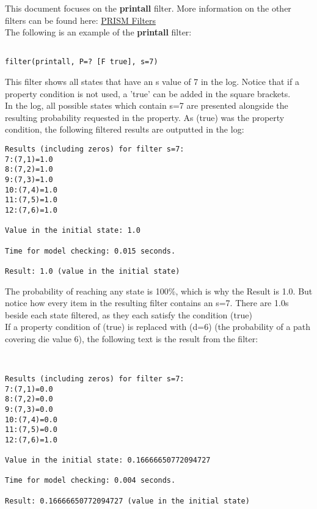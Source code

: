 \documentclass[a4paper]{article}
\begin{document}
This document focuses on the \textbf{printall} filter. 
\newline
More information on the other filters can be found here: \href{http://www.prismmodelchecker.org/manual/PropertySpecification/Filters}{PRISM Filters}
\\[1\baselineskip]
The following is an example of the \textbf{printall} filter:

\begin{lstlisting}

filter(printall, P=? [F true], s=7)
\end{lstlisting}

This filter shows all states that have an s value of 7 in the log. Notice that if a property condition is not used, a 'true' can be added in the square brackets.
\\[1\baselineskip]
In the log, all possible states which contain s=7 are presented alongside the resulting probability requested in the property. As (true) was the property condition, the following filtered results are outputted in the log:

\begin{lstlisting}
Results (including zeros) for filter s=7:
7:(7,1)=1.0
8:(7,2)=1.0
9:(7,3)=1.0
10:(7,4)=1.0
11:(7,5)=1.0
12:(7,6)=1.0

Value in the initial state: 1.0

Time for model checking: 0.015 seconds.

Result: 1.0 (value in the initial state)
\end{lstlisting}

The probability of reaching any state is 100\%, which is why the Result is 1.0. But notice how every item in the resulting filter contains an s=7.
There are 1.0s beside each state filtered, as they each satisfy the condition (true)
\\[1\baselineskip]
If a property condition of (true) is replaced with (d=6) (the probability of a path covering die value 6), the following text is the result from the filter:


\begin{lstlisting}


Results (including zeros) for filter s=7:
7:(7,1)=0.0
8:(7,2)=0.0
9:(7,3)=0.0
10:(7,4)=0.0
11:(7,5)=0.0
12:(7,6)=1.0

Value in the initial state: 0.16666650772094727

Time for model checking: 0.004 seconds.

Result: 0.16666650772094727 (value in the initial state)
\end{lstlisting}
\end{document}
